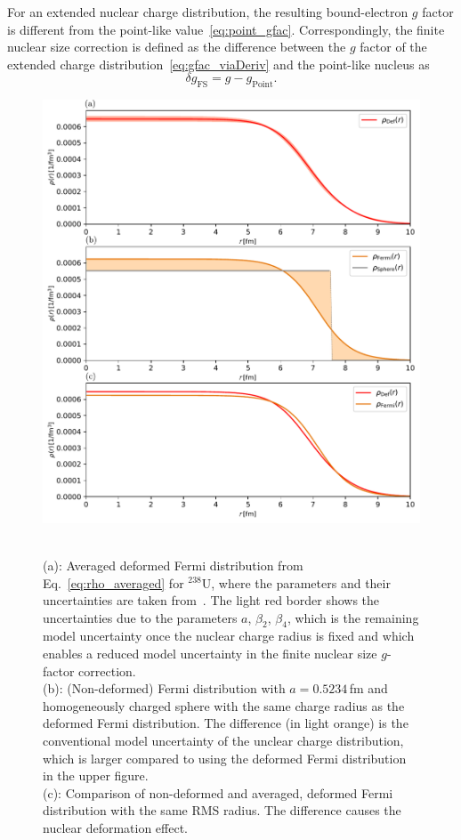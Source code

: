 For an extended nuclear charge distribution, the resulting bound-electron $g$ factor is different from the point-like value~\eqref{eq:point_gfac}. Correspondingly, the finite nuclear size correction is defined as the difference between the $g$ factor of the extended charge distribution~\eqref{eq:gfac_viaDeriv} and the point-like nucleus as
\begin{equation}
\delta g_{\text{FS}}=g-g_{\text{Point}}.
\end{equation}
%
\begin{figure}
\centering
\includegraphics[width=\textwidth]{pics/chargeDistr2.pdf}\\
\caption{\label{fig:charge distr.}\\
(a): Averaged deformed Fermi distribution from Eq.~\ref{eq:rho_averaged} for $^{238}$U, where the parameters and their uncertainties are taken from~\cite{kozhedub2008}. The light red border shows the uncertainties due to the parameters $a$, $\beta_2$, $\beta_4$, which is the remaining model uncertainty once the nuclear charge radius is fixed and which enables a reduced model uncertainty in the finite nuclear size $g$-factor correction.\\
(b): (Non-deformed) Fermi distribution with $a=0.5234\,$fm and homogeneously charged sphere with the same charge radius as the deformed Fermi distribution. The difference (in light orange) is the conventional model uncertainty of the unclear charge distribution, which is larger compared to using the deformed Fermi distribution in the upper figure.\\
(c): Comparison of non-deformed and averaged, deformed Fermi distribution with the same RMS radius. The difference causes the nuclear deformation effect.}
\end{figure}
%
